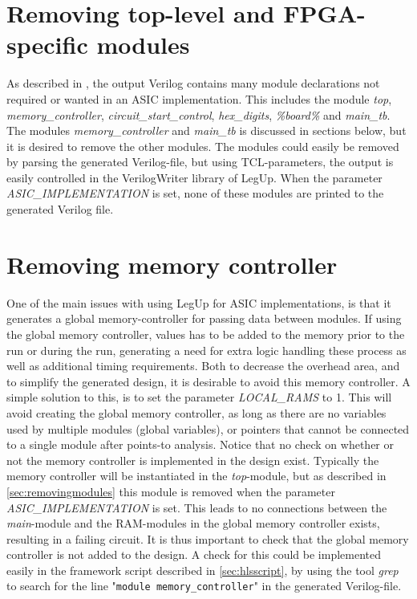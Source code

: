 \section{\label{sec:removingmodules}Removing top-level and FPGA-specific modules}
As described in \cite{holm2015pro}, the output Verilog contains many module declarations not required or wanted in an ASIC implementation. This includes the module \textit{top}, \textit{memory\_controller}, \textit{circuit\_start\_control}, \textit{hex\_digits}, \textit{\%board\%} and \textit{main\_tb}. The modules \textit{memory\_controller} and \textit{main\_tb} is discussed in sections below, but it is desired to remove the other modules. The modules could easily be removed by parsing the generated Verilog-file, but using TCL-parameters, the output is easily controlled in the VerilogWriter library of LegUp. When the parameter \textit{ASIC\_IMPLEMENTATION} is set, none of these modules are printed to the generated Verilog file.

\section{Removing memory controller}
One of the main issues with using LegUp for ASIC implementations, is that it generates a global memory-controller for passing data between modules. If using the global memory controller, values has to be added to the memory prior to the run or during the run, generating a need for extra logic handling these process as well as additional timing requirements. Both to decrease the overhead area, and to simplify the generated design, it is desirable to avoid this memory controller. A simple solution to this, is to set the parameter \textit{LOCAL\_RAMS} to 1. This will avoid creating the global memory controller, as long as there are no variables used by multiple modules (global variables), or pointers that cannot be connected to a single module after points-to analysis. Notice that no check on whether or not the memory controller is implemented in the design exist. Typically the memory controller will be instantiated in the \textit{top}-module, but as described in \cref{sec:removingmodules} this module is removed when the parameter \textit{ASIC\_IMPLEMENTATION} is set. This leads to no connections between the \textit{main}-module and the RAM-modules in the global memory controller exists, resulting in a failing circuit. It is thus important to check that the global memory controller is not added to the design. A check for this could be implemented easily in the framework script described in \cref{sec:hlsscript}, by using the tool \textit{grep} to search for the line "\verb!module memory_controller!" in the generated Verilog-file.

